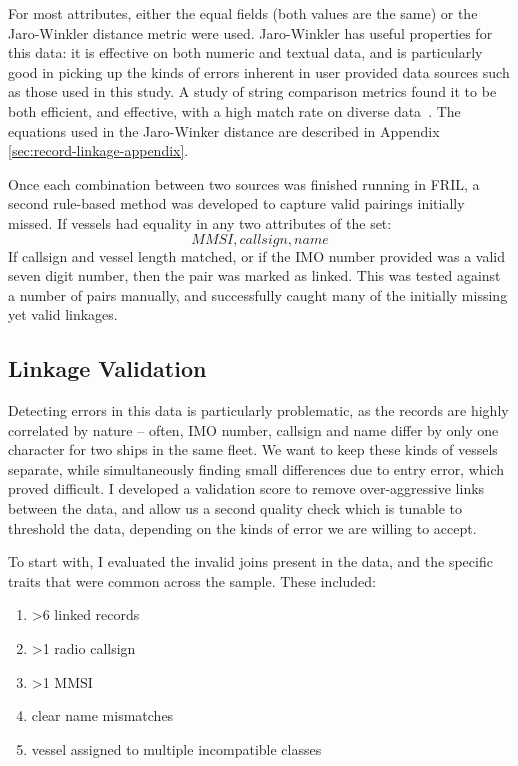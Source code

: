 For most attributes, either the equal fields (both values are the same) or the Jaro-Winkler distance metric were used. Jaro-Winkler has useful properties for this data: it is effective on both numeric and textual data, and is particularly good in picking up the kinds of errors inherent in user provided data sources such as those used in this study. A study of string comparison metrics found it to be both efficient, and effective, with a high match rate on diverse data~\citep{Cohen2003}. The equations used in the Jaro-Winker distance are described in Appendix \ref{sec:record-linkage-appendix}.

Once each combination between two sources was finished running in FRIL, a second rule-based method was developed to capture valid pairings initially missed. If vessels had equality in any two attributes of the set: 
\begin{equation}
{MMSI, callsign, name}
\end{equation}
If callsign and vessel length matched, or if the IMO number provided was a valid seven digit number, then the pair was marked as linked. This was tested against a number of pairs manually, and successfully caught many of the initially missing yet valid linkages.

\subsection{Linkage Validation}

Detecting errors in this data is particularly problematic, as the records are highly correlated by nature -- often, IMO number, callsign and name differ by only one character for two ships in the same fleet. We want to keep these kinds of vessels separate, while simultaneously finding small differences due to entry error, which proved difficult. I developed a validation score to remove over-aggressive links between the data, and allow us a second quality check which is tunable to threshold the data, depending on the kinds of error we are willing to accept.

To start with, I evaluated the invalid joins present in the data, and the specific traits that were common across the sample. These included:
\begin{enumerate}[noitemsep]
 \item >6 linked records
 \item >1 radio callsign
 \item >1 MMSI
 \item clear name mismatches
 \item vessel assigned to multiple incompatible classes
\end{enumerate}


